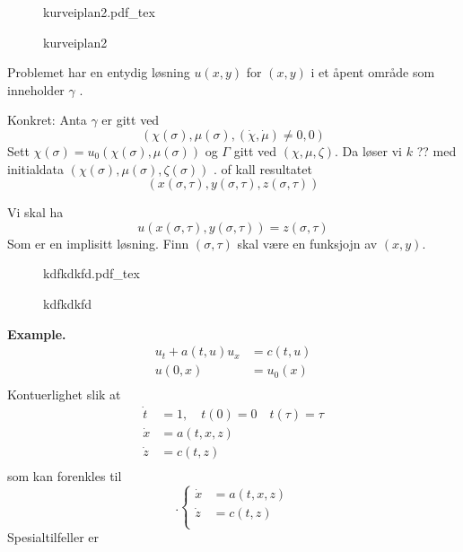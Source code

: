 \documentclass{article}
\newcommand{\incfig}[2][1]{%
\def\svgwidth{#1\columnwidth}
{#2.pdf_tex} } \pdfsuppresswarningpagegroup=1
\theoremstyle{remark}
\newcommand{\newpara}
  {
  \vskip 0.4cm
  }
\begin{document}
\begin{figure}[ht]
    \centering
    \incfig{kurveiplan2}
    \caption{kurveiplan2}
    \label{fig:kurveiplan2}
\end{figure}




\newpage
\begin{theorem}
  Problemet har en entydig løsning $u\left( x,y \right)$ for $\left( x,y \right)$ i et åpent område som inneholder $\gamma $ . 
  
\end{theorem}


  \newpara
  Konkret: Anta $\gamma $ er gitt ved \[
  \left( \chi \left( \sigma  \right), \mu \left( \sigma  \right), \left( \dot{\chi }, \dot{\mu } \right) \neq 0,0 \right)
  \] 
  Sett $\chi \left( \sigma  \right) = u_{0} \left( \chi \left( \sigma  \right), \mu \left( \sigma  \right) \right)$ og $\Gamma $ gitt ved $\left( \chi , \mu , \zeta  \right)$.  Da løser vi $k$ ?? med initialdata $\left( \chi \left( \sigma  \right), \mu \left( \sigma  \right), \zeta \left( \sigma  \right) \right)$ . of kall resultatet \[
  \left( x\left( \sigma , \tau  \right), y\left( \sigma ,\tau  \right), z\left( \sigma ,\tau  \right) \right)
  \] 
  
  \newpara
  Vi skal ha \[
  u\left( x\left( \sigma ,\tau  \right), y\left( \sigma ,\tau  \right) \right) = z\left( \sigma ,\tau  \right)
  \] 
  Som er en implisitt løsning. Finn $\left( \sigma , \tau  \right) $ skal være en funksjojn av $\left( x,y \right)$.
\begin{figure}[ht]
    \centering
    \incfig{kdfkdkfd}
    \caption{kdfkdkfd}
    \label{fig:kdfkdkfd}
\end{figure}

  \textbf{Example.} \[
    \begin{split}
  u_{t} + a\left( t,u \right) u_{x}  & = c\left( t,u \right) \\
  u\left( 0,x \right) &=  u_{0}\left( x \right) \\
    \end{split} 
  \] 
  Kontuerlighet slik at \[
  \begin{split}
    \dot{t} &= 1, \quad  t\left( 0 \right) = 0  \quad  t\left( \tau  \right) = \tau   \\
    \dot{x} &= a\left( t,x,z \right) \\
    \dot{z} &= c\left( t,z \right) \\
  \end{split} 
  \] 
  som kan forenkles til \[
  .
  \begin{cases}
    \dot{x} &= a\left( t,x,z \right) \\
    \dot{z} &= c\left( t,z \right) \\
  \end{cases}
  \] 
  Spesialtilfeller er 
  
\end{document}
